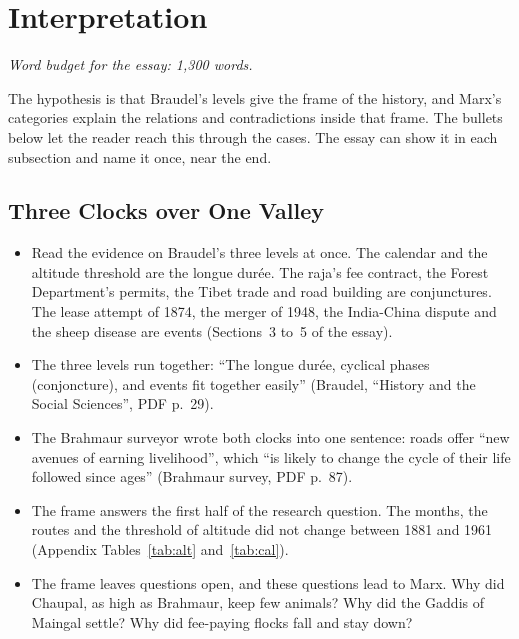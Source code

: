 \documentclass[11pt,a4paper]{article}
\newcommand{\cit}[1]{{\small(#1)}}
\newcommand{\budget}[1]{\par\noindent\textit{Word budget for the essay: #1 words.}\par\smallskip}
\newcommand{\Braudel}{Braudel, \enquote{History and the Social Sciences}}
\begin{document}
\section{Interpretation}\label{sec:interp}
\budget{1,300}

\noindent The hypothesis is that Braudel's levels give the frame of the
history, and Marx's categories explain the relations and contradictions inside
that frame. The bullets below let the reader reach this through the cases. The
essay can show it in each subsection and name it once, near the end.

\subsection{Three Clocks over One Valley}
\begin{itemize}
\item Read the evidence on Braudel's three levels at once. The calendar and the
  altitude threshold are the longue durée. The raja's fee contract, the Forest
  Department's permits, the Tibet trade and road building are conjunctures. The
  lease attempt of 1874, the merger of 1948, the India-China dispute and the
  sheep disease are events \cit{Sections~3 to~5 of the essay}.
\item The three levels run together: \enquote{The longue durée, cyclical phases
  (conjoncture), and events fit together easily} \cit{\Braudel, PDF p.~29}.
\item The Brahmaur surveyor wrote both clocks into one sentence: roads offer
  \enquote{new avenues of earning livelihood}, which \enquote{is likely to change
  the cycle of their life followed since ages} \cit{Brahmaur survey, PDF
  p.~87}.
\item The frame answers the first half of the research question. The months,
  the routes and the threshold of altitude did not change between 1881 and
  1961 \cit{Appendix Tables~\ref{tab:alt} and~\ref{tab:cal}}.
\item The frame leaves questions open, and these questions lead to Marx. Why
  did Chaupal, as high as Brahmaur, keep few animals? Why did the Gaddis of
  Maingal settle? Why did fee-paying flocks fall and stay down?
\end{itemize}
\end{document}
